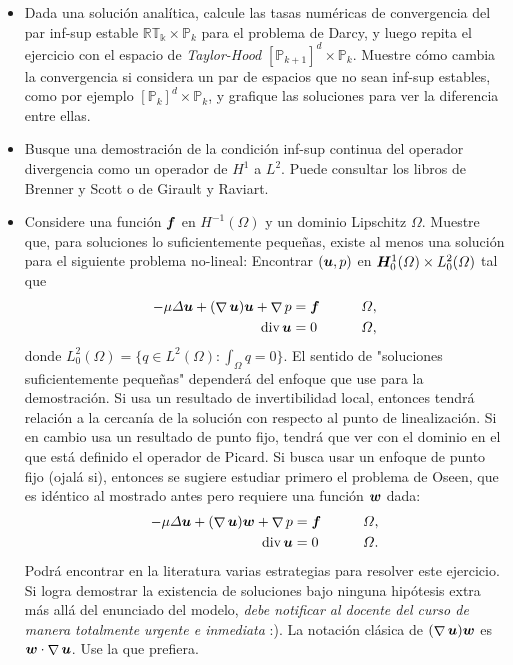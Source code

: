\documentclass{article}
\renewcommand{\P}{{\mathbb{P}}}
\renewcommand{\vec}{\vectorsym}
\DeclareMathOperator{\grad}{\nabla}
\DeclareMathOperator{\dive}{\text{div}}
\begin{document}
\begin{itemize}
    \item Dada una solución analítica, calcule las tasas numéricas de convergencia del par inf-sup estable $\mathbb{RT_k}\times \P_k$ para el problema de Darcy, y luego repita el ejercicio con el espacio de \emph{Taylor-Hood} $[\P_{k+1}]^d\times \P_k$. Muestre cómo cambia la convergencia si considera un par de espacios que no sean inf-sup estables, como por ejemplo $[\P_k]^d\times \P_k$, y grafique las soluciones para ver la diferencia entre ellas.
    \item Busque una demostración de la condición inf-sup continua del operador divergencia como un operador de $H^1$ a $L^2$. Puede consultar los libros de Brenner y Scott o de Girault y Raviart.
    \item Considere una función $\vec f$ en $H^{-1}(\Omega)$ y un dominio Lipschitz $\Omega$. Muestre que, para soluciones lo suficientemente pequeñas, existe al menos una solución para el siguiente problema no-lineal: Encontrar $(\vec u,p)$ en $\vec H_0^1(\Omega)\times L_0^2(\Omega)$ tal que
        $$
        \begin{aligned}
            -\mu\Delta \vec u + (\grad \vec u)\vec u + \grad p &= \vec f &&\qquad \Omega,\\
            \dive \vec u &= 0 && \qquad\Omega,
        \end{aligned}
        $$
        donde $L_0^2(\Omega) = \{q\in L^2(\Omega): \int_\Omega q = 0\}$. El sentido de "soluciones suficientemente pequeñas" dependerá del enfoque que use para la demostración. Si usa un resultado de invertibilidad local, entonces tendrá relación a la cercanía de la solución con respecto al punto de linealización. Si en cambio usa un resultado de punto fijo, tendrá que ver con el dominio en el que está definido el operador de Picard. Si busca usar un enfoque de punto fijo (ojalá si), entonces se sugiere estudiar primero el problema de Oseen, que es idéntico al mostrado antes pero requiere una función $\vec w$ dada:
        $$
        \begin{aligned}
            -\mu\Delta \vec u + (\grad \vec u)\vec w + \grad p &= \vec f &&\qquad \Omega,\\
            \dive \vec u &= 0 && \qquad\Omega.
        \end{aligned}
        $$
        Podrá encontrar en la literatura varias estrategias para resolver este ejercicio. Si logra demostrar la existencia de soluciones bajo ninguna hipótesis extra más allá del enunciado del modelo, \emph{debe notificar al docente del curso de manera totalmente urgente e inmediata} :). La notación clásica de $(\grad \vec u)\vec w$ es $\vec w\cdot \grad \vec u$. Use la que prefiera.



\end{itemize}
\end{document}
